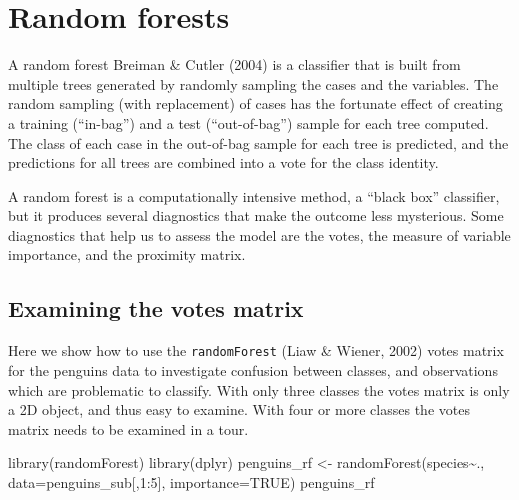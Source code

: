 \documentclass[
  letterpaper,
]{book}
\newenvironment{Shaded}{\begin{snugshade}}{\end{snugshade}}
\newcommand{\AttributeTok}[1]{\textcolor[rgb]{0.40,0.45,0.13}{#1}}
\newcommand{\ConstantTok}[1]{\textcolor[rgb]{0.56,0.35,0.01}{#1}}
\newcommand{\DecValTok}[1]{\textcolor[rgb]{0.68,0.00,0.00}{#1}}
\newcommand{\FunctionTok}[1]{\textcolor[rgb]{0.28,0.35,0.67}{#1}}
\newcommand{\NormalTok}[1]{\textcolor[rgb]{0.00,0.23,0.31}{#1}}
\newcommand{\OtherTok}[1]{\textcolor[rgb]{0.00,0.23,0.31}{#1}}
\newcommand{\SpecialCharTok}[1]{\textcolor[rgb]{0.37,0.37,0.37}{#1}}
\begin{document}

\hypertarget{random-forests}{%
\section{Random forests}\label{random-forests}}

A random forest Breiman \& Cutler (2004) is a classifier that is built
from multiple trees generated by randomly sampling the cases and the
variables. The random sampling (with replacement) of cases has the
fortunate effect of creating a training (``in-bag'') and a test
(``out-of-bag'') sample for each tree computed. The class of each case
in the out-of-bag sample for each tree is predicted, and the predictions
for all trees are combined into a vote for the class identity.

A random forest is a computationally intensive method, a ``black box''
classifier, but it produces several diagnostics that make the outcome
less mysterious. Some diagnostics that help us to assess the model are
the votes, the measure of variable importance, and the proximity matrix.

\hypertarget{examining-the-votes-matrix}{%
\subsection{Examining the votes
matrix}\label{examining-the-votes-matrix}}

Here we show how to use the \texttt{randomForest} (Liaw \& Wiener, 2002)
votes matrix for the penguins data to investigate confusion between
classes, and observations which are problematic to classify. With only
three classes the votes matrix is only a 2D object, and thus easy to
examine. With four or more classes the votes matrix needs to be examined
in a tour.

\begin{Shaded}
\begin{Highlighting}[]
\FunctionTok{library}\NormalTok{(randomForest)}
\FunctionTok{library}\NormalTok{(dplyr)}
\NormalTok{penguins\_rf }\OtherTok{\textless{}{-}} \FunctionTok{randomForest}\NormalTok{(species}\SpecialCharTok{\textasciitilde{}}\NormalTok{.,}
                             \AttributeTok{data=}\NormalTok{penguins\_sub[,}\DecValTok{1}\SpecialCharTok{:}\DecValTok{5}\NormalTok{],}
                             \AttributeTok{importance=}\ConstantTok{TRUE}\NormalTok{)}
\NormalTok{penguins\_rf}
\end{Highlighting}
\end{Shaded}
\end{document}
